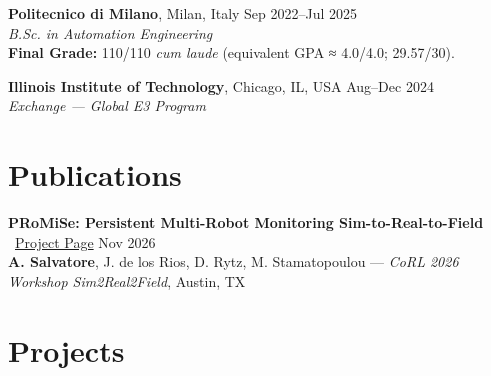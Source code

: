 \documentclass[a4paper,10pt]{article}
\begin{document}
\textbf{Politecnico di Milano}, Milan, Italy \hfill Sep 2022--Jul 2025\\
\textit{B.Sc. in Automation Engineering} \\
\textbf{Final Grade:} 110/110 \textit{cum laude} (equivalent GPA ≈ 4.0/4.0; 29.57/30).\\
\vspace{-10pt}

\textbf{Illinois Institute of Technology}, Chicago, IL, USA \hfill Aug--Dec 2024\\
\textit{Exchange — Global E3 Program} \\
\vspace{-10pt}

\section*{Publications}
\textbf{PRoMiSe: Persistent Multi-Robot Monitoring Sim-to-Real-to-Field} \faGlobe\ \href{https://paperanonyms.github.io/promise/}{Project Page} \hfill Nov 2026\\
\textbf{A. Salvatore}, J. de los Rios, D. Rytz, M. Stamatopoulou --- \textit{CoRL 2026 Workshop Sim2Real2Field}, Austin, TX
\vspace{4pt}

\section*{Projects}
\end{document}
